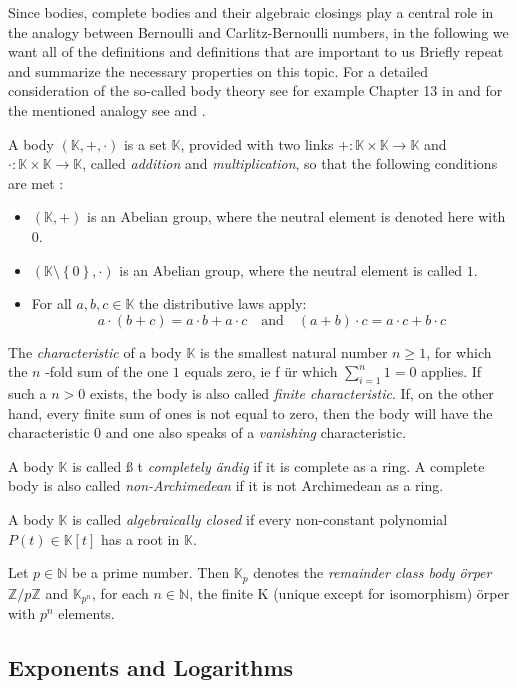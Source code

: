 Since bodies, complete bodies and their algebraic closings play a central role in the analogy between Bernoulli and Carlitz-Bernoulli numbers, in the following we want all of the definitions and definitions that are important to us Briefly repeat and summarize the necessary properties on this topic.
For a detailed consideration of the so-called body theory see for example Chapter 13 in \cite{MA} and for the mentioned analogy see \cite{DG} and \cite{DT}.
\begin{definition} [body]
A body $ (\mathbb{K}, +, \cdot) $ is a set $ \mathbb{K} $, provided with two links $ +: \mathbb{K} \times \mathbb{K} \to \mathbb{K} $ and $ \cdot: \mathbb{K} \times \mathbb{K} \to \mathbb{K} $, called \textit{addition} and \textit{multiplication}, so that the following conditions are met :
\begin{itemize}
\item $ \left (\mathbb{K}, + \right) $ is an Abelian group, where the neutral element is denoted here with $ 0 $.
\item $ \left (\mathbb{K} \setminus \left \{0 \right \}, \cdot \right) $ is an Abelian group, where the neutral element is called $ 1 $.
\item For all $ a, b, c \in \mathbb{K} $ the distributive laws apply:
$$ a \cdot \left (b + c \right) = a \cdot b + a \cdot c \quad \text{and} \quad
\left (a + b \right) \cdot c = a \cdot c + b \cdot c $$
\end{itemize}
The \textit{characteristic} of a body $ \mathbb{K} $ is the smallest natural number $ n \geq 1 $, for which the $ n $ -fold sum of the one $ 1 $ equals zero, ie f \"ur which $ \sum_{i = 1} ^ n 1 = 0 $ applies.
If such a $ n> 0 $ exists, the body is also called \textit{finite characteristic}. If, on the other hand, every finite sum of ones is not equal to zero, then the body will have the characteristic $ 0 $ and one also speaks of a \textit{vanishing} characteristic.

A body $ \mathbb{K} $ is called \ss{} t \textit{completely \"andig} if
it is complete as a ring. A complete body
is also called \textit{non-Archimedean} if it is not Archimedean as a ring.

A body $ \mathbb{K} $ is called \textit{algebraically closed} if every non-constant polynomial $ P (t) \in \mathbb{K} [t] $
has a root in $ \mathbb{K} $.
\end{definition}
\begin{definition}  Let $ p \in \mathbb{N} $ be a prime number. Then $ \mathbb{K} _p $ denotes the \textit{remainder class body \"orper} $ \mathbb{ Z} / p \mathbb{Z} $ and $ \mathbb{K} _{p ^ n} $, for each $ n \in \mathbb{N} $, the finite K (unique except for isomorphism) \"orper with $ p ^ n $ elements.
\end{definition} 



\subsection{Exponents and Logarithms}
